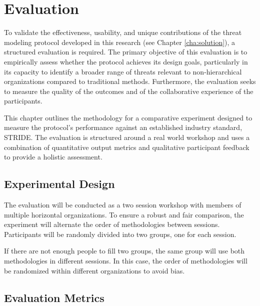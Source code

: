 
%

\chapter{Evaluation}
\label{cha:evaluation}

\glsresetall

To validate the effectiveness, usability, and unique contributions of the threat
modeling protocol developed in this research (see Chapter \ref{cha:solution}), a
structured evaluation is required. The primary objective of this evaluation is
to empirically assess whether the protocol achieves its design goals,
particularly in its capacity to identify a broader range of threats relevant to
non-hierarchical organizations compared to traditional methods. Furthermore, the
evaluation seeks to measure the quality of the outcomes and of the collaborative
experience of the participants.

This chapter outlines the methodology for a comparative experiment designed to
measure the protocol's performance against an established industry standard,
STRIDE. The evaluation is structured around a real world workshop and uses a
combination of quantitative output metrics and qualitative participant feedback
to provide a holistic assessment.

\section{Experimental Design}
\label{sec:experimental_design}

The evaluation will be conducted as a two session workshop with members
of multiple horizontal organizations. To ensure a robust and fair comparison, the
experiment will alternate the order of methodologies between sessions. Participants
will be randomly divided into two groups, one for each session.

If there are not enough people to fill two groups, the same group
will use both methodologies in different sessions. In this case, the
order of methodologies will be randomized within different
organizations to avoid bias.

\section{Evaluation Metrics}
\label{sec:evaluation_metrics}

